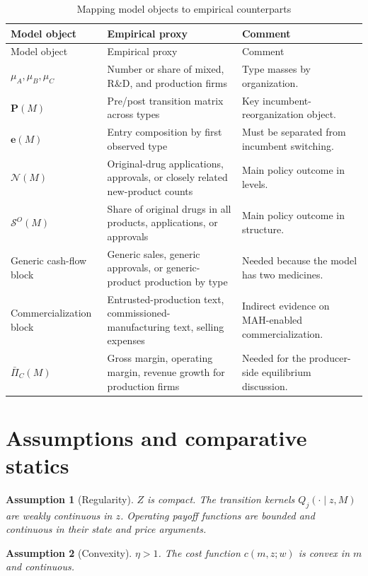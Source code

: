\documentclass[12pt]{article}
\newtheorem{assumption}{Assumption}
\newcommand{\1}{\mathbf{1}}
\newcommand{\Inew}{\mathcal{N}}
\newcommand{\ShareO}{\mathcal{S}^O}
\begin{document}
\begin{longtable}{p{}p{}p{}}
\caption{Mapping model objects to empirical counterparts}\label{tab:mapping}\\
\toprule
Model object & Empirical proxy & Comment \\
\midrule
\endfirsthead
\toprule
Model object & Empirical proxy & Comment \\
\midrule
\endhead
$\mu_A,\mu_B,\mu_C$ & Number or share of mixed, R\&D, and production firms & Type masses by organization. \\
$\mathbf P(M)$ & Pre/post transition matrix across types & Key incumbent-reorganization object. \\
$\mathbf e(M)$ & Entry composition by first observed type & Must be separated from incumbent switching. \\
$\Inew(M)$ & Original-drug applications, approvals, or closely related new-product counts & Main policy outcome in levels. \\
$\ShareO(M)$ & Share of original drugs in all products, applications, or approvals & Main policy outcome in structure. \\
Generic cash-flow block & Generic sales, generic approvals, or generic-product production by type & Needed because the model has two medicines. \\
Commercialization block & Entrusted-production text, commissioned-manufacturing text, selling expenses & Indirect evidence on MAH-enabled commercialization. \\
$\bar\Pi_C(M)$ & Gross margin, operating margin, revenue growth for production firms & Needed for the producer-side equilibrium discussion. \\
\bottomrule
\end{longtable}

\section{Assumptions and comparative statics}

\begin{assumption}[Regularity]
$Z$ is compact. The transition kernels $Q_j(\cdot\mid z,M)$ are weakly continuous in $z$. Operating payoff functions are bounded and continuous in their state and price arguments.
\end{assumption}

\begin{assumption}[Convexity]
$\eta>1$. The cost function $c(m,z;w)$ is convex in $m$ and continuous.
\end{assumption}
\end{document}

